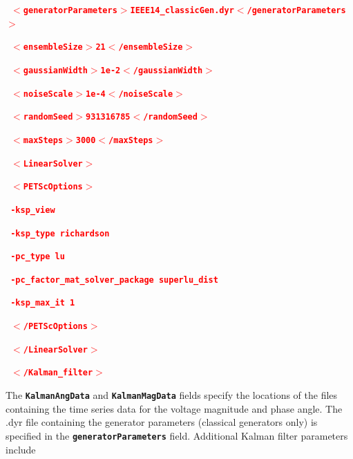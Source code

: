 \documentclass[12pt]{report} %
\begin{document}
\textcolor{red}{\texttt{\textbf{    $\boldsymbol{\mathrm{<}}$generatorParameters$\boldsymbol{\mathrm{>}}$IEEE14\_classicGen.dyr$\boldsymbol{\mathrm{<}}$/generatorParameters$\boldsymbol{\mathrm{>}}$}}}

\textcolor{red}{\texttt{\textbf{    $\boldsymbol{\mathrm{<}}$ensembleSize$\boldsymbol{\mathrm{>}}$21$\boldsymbol{\mathrm{<}}$/ensembleSize$\boldsymbol{\mathrm{>}}$}}}

\textcolor{red}{\texttt{\textbf{    $\boldsymbol{\mathrm{<}}$gaussianWidth$\boldsymbol{\mathrm{>}}$1e-2$\boldsymbol{\mathrm{<}}$/gaussianWidth$\boldsymbol{\mathrm{>}}$}}}

\textcolor{red}{\texttt{\textbf{    $\boldsymbol{\mathrm{<}}$noiseScale$\boldsymbol{\mathrm{>}}$1e-4$\boldsymbol{\mathrm{<}}$/noiseScale$\boldsymbol{\mathrm{>}}$}}}

\textcolor{red}{\texttt{\textbf{    $\boldsymbol{\mathrm{<}}$randomSeed$\boldsymbol{\mathrm{>}}$931316785$\boldsymbol{\mathrm{<}}$/randomSeed$\boldsymbol{\mathrm{>}}$}}}

\textcolor{red}{\texttt{\textbf{    $\boldsymbol{\mathrm{<}}$maxSteps$\boldsymbol{\mathrm{>}}$3000$\boldsymbol{\mathrm{<}}$/maxSteps$\boldsymbol{\mathrm{>}}$}}}

\textcolor{red}{\texttt{\textbf{    $\boldsymbol{\mathrm{<}}$LinearSolver$\boldsymbol{\mathrm{>}}$}}}

\textcolor{red}{\texttt{\textbf{      $\boldsymbol{\mathrm{<}}$PETScOptions$\boldsymbol{\mathrm{>}}$}}}

\textcolor{red}{\texttt{\textbf{        -ksp\_view}}}

\textcolor{red}{\texttt{\textbf{        -ksp\_type richardson}}}

\textcolor{red}{\texttt{\textbf{        -pc\_type lu}}}

\textcolor{red}{\texttt{\textbf{        -pc\_factor\_mat\_solver\_package superlu\_dist}}}

\textcolor{red}{\texttt{\textbf{        -ksp\_max\_it 1}}}

\textcolor{red}{\texttt{\textbf{      $\boldsymbol{\mathrm{<}}$/PETScOptions$\boldsymbol{\mathrm{>}}$}}}

\textcolor{red}{\texttt{\textbf{    $\boldsymbol{\mathrm{<}}$/LinearSolver$\boldsymbol{\mathrm{>}}$}}}

\textcolor{red}{\texttt{\textbf{  $\boldsymbol{\mathrm{<}}$/Kalman\_filter$\boldsymbol{\mathrm{>}}$}}}

The \texttt{\textbf{KalmanAngData}} and \texttt{\textbf{KalmanMagData}} fields specify the locations of the files containing the time series data for the voltage magnitude and phase angle. The .dyr file containing the generator parameters (classical generators only) is specified in the \texttt{\textbf{generatorParameters}} field. Additional Kalman filter parameters include
\end{document}
